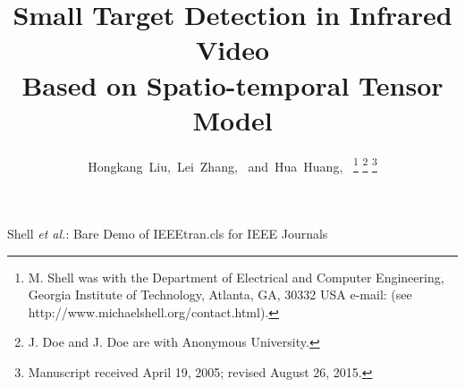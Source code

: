 \documentclass[journal]{IEEEtran}
\begin{document}
\title{Small Target Detection in Infrared Video \\Based on Spatio-temporal Tensor Model}
%
%
%

\author{Hongkang~Liu,~Lei~Zhang,~
        and~Hua~Huang,~%
\thanks{M. Shell was with the Department
of Electrical and Computer Engineering, Georgia Institute of Technology, Atlanta,
GA, 30332 USA e-mail: (see http://www.michaelshell.org/contact.html).}%
\thanks{J. Doe and J. Doe are with Anonymous University.}%
\thanks{Manuscript received April 19, 2005; revised August 26, 2015.}}

% 
%



%
{Shell \MakeLowercase{\textit{et al.}}: Bare Demo of IEEEtran.cls for IEEE Journals}
% 
\end{document}
